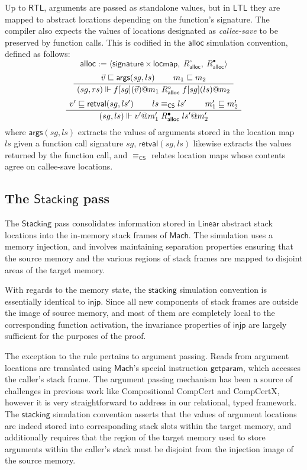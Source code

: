 \documentclass[sigplan,10pt,review,anonymous]{acmart}\settopmatter{printfolios=true,printccs=false,printacmref=false}
\newcommand{\kw}[1]{\ensuremath{ \mathsf{#1} }}
\newcommand{\que}{\circ}
\newcommand{\ans}{\bullet}
\begin{document}
Up to \kw{RTL},
arguments are passed as standalone values,
but in \kw{LTL}
they are mapped to abstract locations
depending on the function's signature.
The compiler also expects the values of
locations designated as \emph{callee-save}
to be preserved by function calls.
This is codified in the $\kw{alloc}$
simulation convention, defined as follows:
\[
  \kw{alloc} := \langle
      \kw{signature} \times \kw{locmap}, \:
      R_\kw{alloc}^\que, \:
      R_\kw{alloc}^\ans \rangle
\]
\[
  \AxiomC{$\vec{v} \sqsubseteq \kw{args}(sg, ls)$}
  \AxiomC{$m_1 \sqsubseteq m_2$}
  \BinaryInfC{$
      (sg, rs) \Vdash
      f[sg](\vec{v})@m_1
      \mathrel{R_\kw{alloc}^\que}
      f[sg](ls)@m_2$}
  \DisplayProof
\]
\vspace{0.5ex}
\[
  \AxiomC{$v' \sqsubseteq \kw{retval}(sg, ls')$}
  \AxiomC{$ls \equiv_\kw{CS} ls'$}
  \AxiomC{$m_1' \sqsubseteq m_2'$}
  \TrinaryInfC{$
      (sg, ls) \Vdash
      v'@m_1'
      \mathrel{R_\kw{alloc}^\ans}
      ls'@m_2'$}
  \DisplayProof
\]
where $\kw{args}(sg, ls)$ extracts the values of arguments
stored in the location map $ls$ given a function call signature $sg$,
$\kw{retval}(sg, ls)$ likewise extracts the
values returned by the function call, and
$\equiv_\kw{CS}$ relates location maps whose contents agree
on callee-save locations.


\subsection{The \kw{Stacking} pass} %

The \kw{Stacking} pass
consolidates information stored in
\kw{Linear} abstract stack locations
into the in-memory stack frames of \kw{Mach}.
The simulation uses a memory injection,
and involves maintaining separation properties
ensuring that the source memory and
the various regions of stack frames
are mapped to disjoint areas of the target memory.

With regards to the memory state,
the \kw{stacking} simulation convention
is essentially identical to \kw{injp}.
Since all new components of stack frames
are outside the image of source memory,
and most of them are completely local to
the corresponding function activation,
the invariance properties of \kw{injp}
are largely sufficient for the purposes of the proof.

The exception to the rule pertains to argument passing.
Reads from argument locations are translated
using \kw{Mach}'s special instruction \kw{getparam},
which accesses the caller's stack frame.
The argument passing mechanism has been a source of challenges
in previous work like Compositional CompCert and CompCertX,
however it is very straightforward to address
in our relational, typed framework.
The \kw{stacking} simulation convention
asserts that the values of argument locations
are indeed stored into corresponding stack slots
within the target memory,
and additionally
requires that the region of the target memory
used to store arguments within the caller's stack
must be disjoint from the injection image of the source memory.
\end{document}

